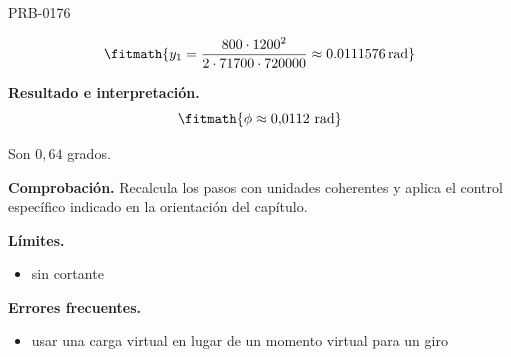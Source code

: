 \begin{studiumworked}{PRB-0176}
\begin{enumerate}
\[\fitmath{y_{1}=\frac{800\cdot {1200}^{2}}{2\cdot 71700\cdot 720000}\approx 0.0111576\,\mathrm{rad}}\]

\end{enumerate}

\textbf{Resultado e interpretación.}\[\fitmath{\phi \approx 0{,}0112\ \mathrm{rad}}\]

Son $0{,}64$ grados.

\par\textbf{Comprobación.} Recalcula los pasos con unidades coherentes y aplica el control específico indicado en la orientación del capítulo.

\textbf{Límites.}\begin{itemize}\item sin cortante\end{itemize}

\textbf{Errores frecuentes.}\begin{itemize}\item usar una carga virtual en lugar de un momento virtual para un giro\end{itemize}

\end{studiumworked}

\Needspace{.3\textheight}


